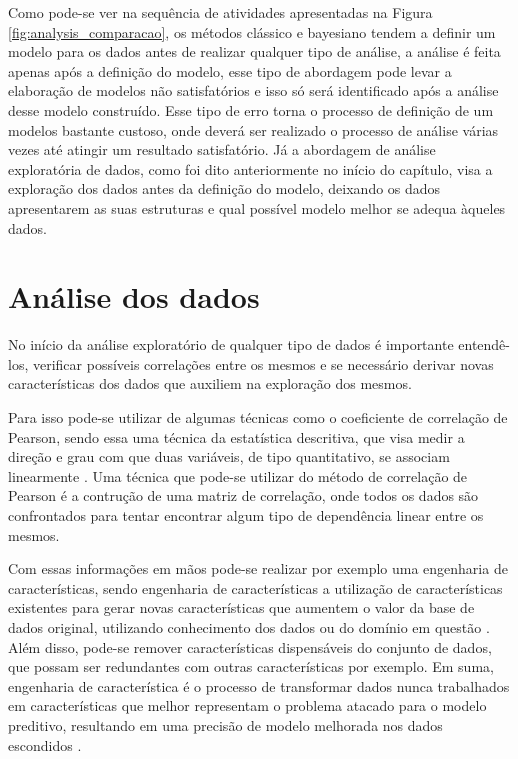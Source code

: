 Como pode-se ver na sequência de atividades apresentadas na Figura
\ref{fig:analysis_comparacao}, os métodos clássico e bayesiano tendem a definir
um modelo para os dados antes de realizar qualquer tipo de análise, a análise é
feita apenas após a definição do modelo, esse tipo de abordagem pode levar a
elaboração de modelos não satisfatórios e isso só será identificado após a
análise desse modelo construído. Esse tipo de erro torna o processo de definição
de um modelos bastante custoso, onde deverá ser realizado o processo de análise
várias vezes até atingir um resultado satisfatório. Já a abordagem de análise
exploratória de dados, como foi dito anteriormente no início do capítulo, visa a
exploração dos dados antes da definição do modelo, deixando os dados
apresentarem as suas estruturas e qual possível modelo melhor se adequa àqueles
dados.

\section{Análise dos dados}

No início da análise exploratório de qualquer tipo de dados é importante
entendê-los, verificar possíveis correlações entre os mesmos e se necessário
derivar novas características dos dados que auxiliem na exploração dos mesmos.

Para isso pode-se utilizar de algumas técnicas como o coeficiente de correlação
de Pearson, sendo essa uma técnica da estatística descritiva, que visa medir a
direção e grau com que duas variáveis, de tipo quantitativo, se associam
linearmente \cite{rossman:1996}. Uma técnica que pode-se utilizar do método de
correlação de Pearson é a contrução de uma matriz de correlação, onde todos os
dados são confrontados para tentar encontrar algum tipo de dependência linear
entre os mesmos. 

Com essas informações em mãos pode-se realizar por exemplo uma engenharia de
características, sendo engenharia de características a utilização de
características existentes para gerar novas características que aumentem o valor
da base de dados original, utilizando conhecimento dos dados ou do domínio em
questão \cite{brink:2014}. Além disso, pode-se remover características
dispensáveis do conjunto de dados, que possam ser redundantes com outras
características por exemplo. Em suma, engenharia de característica é o processo
de transformar dados nunca trabalhados em características que melhor representam
o problema atacado para o modelo preditivo, resultando em uma precisão de modelo
melhorada nos dados escondidos \cite{brownlee:2014}.

